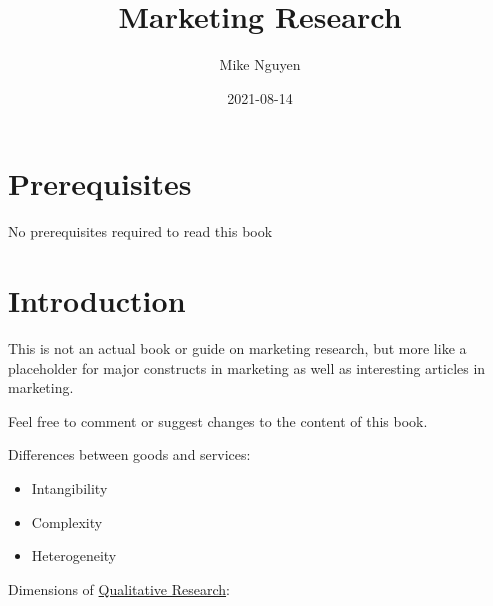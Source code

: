 \documentclass[
]{book}
\title{Marketing Research}
\author{Mike Nguyen}
\date{2021-08-14}
\providecommand{\tightlist}{%
  \setlength{\itemsep}{0pt}\setlength{\parskip}{0pt}}
\begin{document}
\maketitle

{
\setcounter{tocdepth}{1}
\tableofcontents
}
\hypertarget{prerequisites}{%
\chapter{Prerequisites}\label{prerequisites}}

No prerequisites required to read this book

\hypertarget{intro}{%
\chapter{Introduction}\label{intro}}

This is not an actual book or guide on marketing research, but more like a placeholder for major constructs in marketing
as well as interesting articles in marketing.

Feel free to comment or suggest changes to the content of this book.

Differences between goods and services:

\begin{itemize}
\tightlist
\item
  Intangibility\\
\item
  Complexity\\
\item
  Heterogeneity
\end{itemize}

Dimensions of \href{https://www.sagepub.com/sites/default/files/upm-binaries/34087_Chapter1.pdf}{Qualitative Research}:
\end{document}
